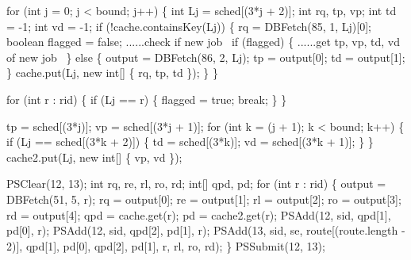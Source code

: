 \documentclass{article}
\def\nwendcode{\endtrivlist \endgroup}
\let\nwdocspar=\par
\theoremstyle{definition}
\begin{document}
for (int j = 0; j < bound; j++) \{
  int Lj = sched[(3*j + 2)];
  int rq, tp, vp;
  int td = -1;
  int vd = -1;
  if (!cache.containsKey(Lj)) \{
    rq = DBFetch(85, 1, Lj)[0];
    boolean flagged = false;
    \LA{}......check if new job~{\nwtagstyle{}}\RA{}
    if (flagged) \{
      \LA{}......get tp, vp, td, vd of new job~{\nwtagstyle{}}\RA{}
    \} else \{
      output = DBFetch(86, 2, Lj);
      tp = output[0];
      td = output[1];
    \}
    cache.put(Lj, new int[] \{ rq, tp, td \});
  \}
\}
\nwendcode{}\nwdocspar
\nwenddocs{}\endmoddef{}
for (int r : rid) \{
  if (Lj == r) \{
    flagged = true;
    break;
  \}
\}
\nwendcode{}\nwdocspar
\nwenddocs{}\endmoddef{}
tp = sched[(3*j)];
vp = sched[(3*j + 1)];
for (int k = (j + 1); k < bound; k++) \{
  if (Lj == sched[(3*k + 2)]) \{
    td = sched[(3*k)];
    vd = sched[(3*k + 1)];
  \}
\}
cache2.put(Lj, new int[] \{ vp, vd \});
\nwendcode{}\nwdocspar
\nwenddocs{}\endmoddef{}
PSClear(12, 13);
int rq, re, rl, ro, rd;
int[] qpd, pd;
for (int r : rid) \{
  output = DBFetch(51, 5, r);
  rq = output[0];
  re = output[1];
  rl = output[2];
  ro = output[3];
  rd = output[4];
  qpd = cache.get(r);
  pd = cache2.get(r);
  PSAdd(12, sid, qpd[1], pd[0], r);
  PSAdd(12, sid, qpd[2], pd[1], r);
  PSAdd(13, sid, se, route[(route.length - 2)], qpd[1], pd[0], qpd[2], pd[1],
        r, rl, ro, rd);
\}
PSSubmit(12, 13);
\nwendcode{}\nwdocspar
\end{document}
